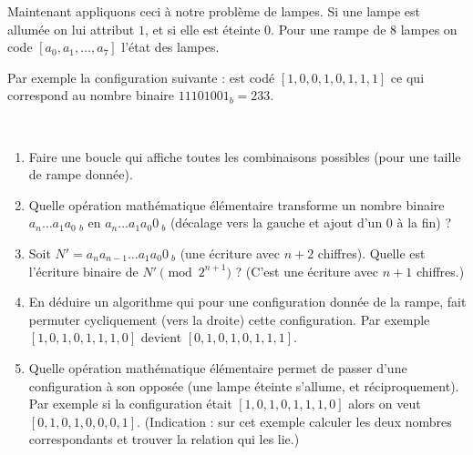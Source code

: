 \documentclass[class=report,crop=false]{standalone}
\begin{document}
Maintenant appliquons ceci à notre problème de lampes.
Si une lampe est allumée on lui attribut $1$, et si elle est éteinte $0$.
Pour une rampe de $8$ lampes on code $[a_0,a_1,\ldots,a_7]$ l'état des lampes.

Par exemple la configuration suivante :
est codé $[1,0,0,1,0,1,1,1]$ ce qui correspond au nombre binaire
$11101001_b = 233$.



\begin{tp}~

\begin{enumerate}
  \item Faire une boucle qui affiche toutes les combinaisons possibles (pour une taille de rampe donnée).

  \item Quelle opération mathématique élémentaire transforme un nombre binaire
 $a_n \ldots a_1 a_0 \ _b$ en $a_n \ldots a_1 a_0 0\ _b$ (décalage vers la gauche et ajout d'un $0$ à la fin) ?

 \item Soit $N' = a_n a_{n-1} \ldots a_1 a_0 0 \ _b$ (une écriture avec $n+2$ chiffres).
 Quelle est l'écriture binaire de $N' \pmod {2^{n+1}}$ ? (C'est une écriture avec $n+1$ chiffres.)

 \item En déduire un algorithme qui pour une configuration donnée de la rampe, fait permuter cycliquement
 (vers la droite) cette configuration. Par exemple $[1,0,1,0,1,1,1,0]$ devient $[0,1,0,1,0,1,1,1]$.

 \item Quelle opération mathématique élémentaire permet de passer d'une configuration à son opposée (une lampe éteinte s'allume,
 et réciproquement). Par exemple si la configuration était $[1,0,1,0,1,1,1,0]$ alors on veut $[0,1,0,1,0,0,0,1]$.
 (Indication : sur cet exemple calculer les deux nombres correspondants et trouver la relation qui les lie.)
\end{enumerate}
\end{tp}
\end{document}

